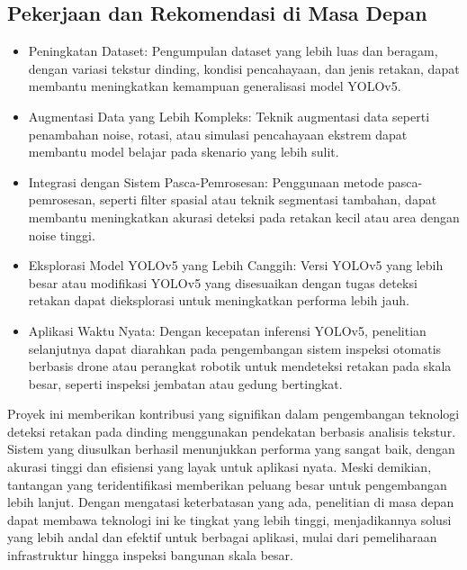 \documentclass[12pt,a4paper]{article}
\begin{document}
\begin{adjustwidth}{3em}{0pt}
\subsection{Pekerjaan dan Rekomendasi di Masa Depan}
\begin{itemize}
    \item Peningkatan Dataset: Pengumpulan dataset yang lebih luas dan beragam, dengan variasi tekstur dinding, kondisi pencahayaan, dan jenis retakan, dapat membantu meningkatkan kemampuan generalisasi model YOLOv5.
    \item Augmentasi Data yang Lebih Kompleks: Teknik augmentasi data seperti penambahan noise, rotasi, atau simulasi pencahayaan ekstrem dapat membantu model belajar pada skenario yang lebih sulit.
    \item Integrasi dengan Sistem Pasca-Pemrosesan: Penggunaan metode pasca-pemrosesan, seperti filter spasial atau teknik segmentasi tambahan, dapat membantu meningkatkan akurasi deteksi pada retakan kecil atau area dengan noise tinggi.
    \item Eksplorasi Model YOLOv5 yang Lebih Canggih: Versi YOLOv5 yang lebih besar atau modifikasi YOLOv5 yang disesuaikan dengan tugas deteksi retakan dapat dieksplorasi untuk meningkatkan performa lebih jauh.
    \item Aplikasi Waktu Nyata: Dengan kecepatan inferensi YOLOv5, penelitian selanjutnya dapat diarahkan pada pengembangan sistem inspeksi otomatis berbasis drone atau perangkat robotik untuk mendeteksi retakan pada skala besar, seperti inspeksi jembatan atau gedung bertingkat.
\end{itemize}
\hspace{0.5cm} Proyek ini memberikan kontribusi yang signifikan dalam pengembangan teknologi deteksi retakan pada dinding menggunakan pendekatan berbasis analisis tekstur. Sistem yang diusulkan berhasil menunjukkan performa yang sangat baik, dengan akurasi tinggi dan efisiensi yang layak untuk aplikasi nyata. Meski demikian, tantangan yang teridentifikasi memberikan peluang besar untuk pengembangan lebih lanjut. Dengan mengatasi keterbatasan yang ada, penelitian di masa depan dapat membawa teknologi ini ke tingkat yang lebih tinggi, menjadikannya solusi yang lebih andal dan efektif untuk berbagai aplikasi, mulai dari pemeliharaan infrastruktur hingga inspeksi bangunan skala besar.



\end{adjustwidth}
\newpage
\end{document}
